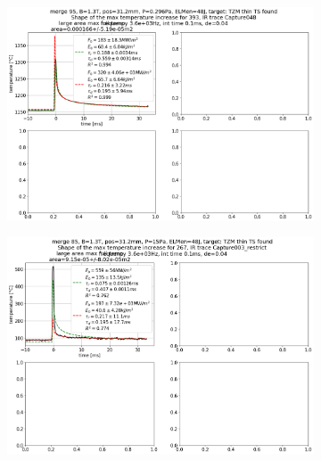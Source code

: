 \begin{figure}[!ht]
     \centering
     \begin{subfigure}{0.45\linewidth}
         \centering
         \includegraphics[width=\textwidth,trim={6 322 535 65.5},clip]{Chapters/chapter3/figs/file_index_393_IR_trace_Capture048_44.png}
         \vspace{-20mm}
         \caption{\phantom{wewwwwwwwwwww}}
         \label{fig:IR1a}
     \end{subfigure}
     \hfill
     \vspace*{+12mm}
     \hfill
     \centering
     \begin{subfigure}{0.45\linewidth}
         \centering
         \includegraphics[width=\textwidth,trim={6 322 535 65.5},clip]{Chapters/chapter3/figs/file_index_267_IR_trace_Capture003_restrict_44.png}

\end{subfigure}
\end{figure}
